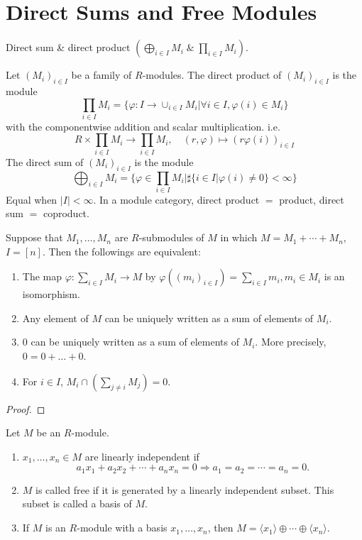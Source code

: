 \documentclass[11pt, a4paper]{report}
\begin{document}
\section{Direct Sums and Free Modules}

\begin{definition}
Direct sum \& direct product $\left(\bigoplus_{i \in I} M_i \; \& \; \prod_{i \in I} M_i\right)$.

Let $ (M_i)_{i \in I} $ be a family of $ R $-modules. The direct product of $ (M_i)_{i \in I} $ is the module
\[
\prod_{i \in I} M_i = \{ \varphi: I \to \cup_{i \in I}M_i | \forall i \in I, \varphi(i) \in M_i \}
\]
with the componentwise addition and scalar multiplication. i.e.
\[
R \times \prod_{i \in I} M_i \to \prod_{i \in I} M_i, \quad (r, \varphi) \mapsto (r \varphi(i))_{i \in I}
\]
The direct sum of $ (M_i)_{i \in I} $ is the module
\[
\bigoplus_{i \in I} M_i = \{ \varphi \in \prod_{i \in I} M_i | \sharp \{ i \in I | \varphi(i) \neq 0 \} < \infty \}
\]
Equal when $|I| < \infty$. In a module category, direct product $=$ product, direct sum $=$ coproduct. 
\end{definition}

\begin{theorem} 
Suppose that $ M_1, \ldots , M_n $ are $ R $-submodules of $ M $ in which $ M = M_1 + \cdots + M_n $, $ I=[n] $. Then the followings are equivalent:
\begin{enumerate}
\item The map $ \varphi:  \sum_{i \in I} M_i \to M $ by $ \varphi( (m_i)_{i \in I} ) = \sum_{i \in I} m_i, m_i \in M_i $ is an isomorphism.
\item Any element of $ M $ can be uniquely written as a sum of elements of $ M_i $.
\item $ 0 $ can be uniquely written as a sum of elements of $ M_i $. More precisely, $ 0 = 0 + \ldots + 0 $. 
\item For $ i \in I $, $ M_i \cap (\sum_{j \neq i} M_j) = 0 $. 
\end{enumerate}
\end{theorem}

\begin{proof} 

\end{proof}

\begin{definition}
Let $M$ be an $R$-module.
\begin{enumerate}
\item $x_{1}, \dots, x_{n} \in M$ are linearly independent if
\[
a_{1} x_{1} + a_{2} x_{2} + \cdots + a_{n} x_{n} = 0 \Rightarrow a_{1} = a_{2} = \cdots = a_{n} = 0.
\]
\item $M$ is called free if it is generated by a linearly independent subset. This subset is called a basis of $M$.
\item If $M$ is an $R$-module with a basis $x_{1}, \ldots, x_{n}$, then $M = \langle x_{1} \rangle \oplus \cdots \oplus \langle x_{n} \rangle$.
\end{enumerate}
\end{definition}
\end{document}
